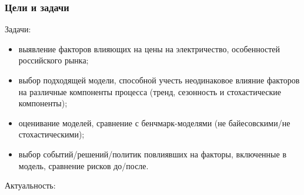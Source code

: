 \documentclass[c, dvipsnames]{beamer}  %
\begin{document}
\begin{frame}[shrink=3]
\frametitle{Цели и задачи} 


\begin{block}{Задачи:}


	\begin{itemize}
		
		\item  выявление факторов  влияющих на цены на электричество, особенностей российского рынка; 
		
		
		

				  
		\item  выбор подходящей модели, способной учесть неодинаковое    влияние факторов на различные компоненты процесса (тренд, сезонность и стохастические компоненты);
		  
 
		\item  оценивание моделей, сравнение с бенчмарк-моделями (не байесовскими/не стохастическими);
		
		\item  выбор событий/решений/политик повлиявших на факторы, включенные в модель, сравнение рисков до/после. 


		
	\end{itemize}
	
\end{block}

\begin{block}{Актуальность:}
	\begin{itemize}
		

\end{itemize}
\end{block}
\end{frame}
\end{document}
